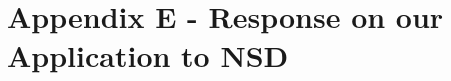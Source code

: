\newpage
\section*{Appendix E - Response on our Application to NSD}
\label{app:presentation}
\begin{figure}[H] 
\end{figure}  
